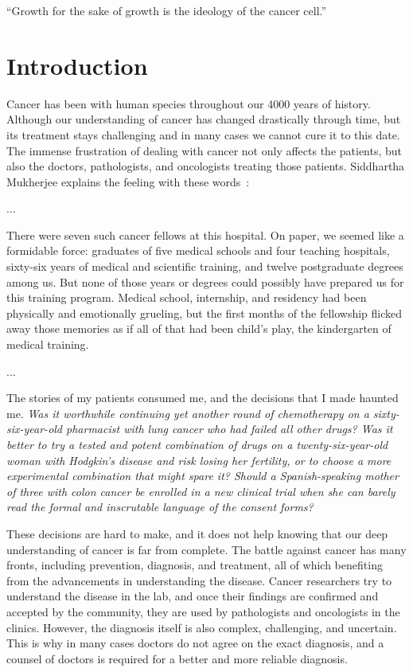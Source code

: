 
\begin{savequote}[.5\linewidth]
  ``Growth for the sake of growth is the ideology of the cancer cell.''
\end{savequote}
\chapter{Introduction}
Cancer has been with human species throughout our 4000 years of history. Although our understanding of cancer has changed drastically through time, but its treatment stays challenging and in many cases we cannot cure it to this date. The immense frustration of dealing with cancer not only affects the patients, but also the doctors, pathologists, and oncologists treating those patients. Siddhartha Mukherjee explains the feeling with these words~\cite[prologue]{the-emperor-of-all-maladies}:

\begin{displayquote}
  ...
  
  There were seven such cancer fellows at this hospital. On paper, we seemed like a formidable force: graduates of five medical schools and four teaching hospitals, sixty-six years of medical and scientific training, and twelve postgraduate degrees among us. But none of those years or degrees could possibly have prepared us for this training program. Medical school, internship, and residency had been physically and emotionally grueling, but the first months of the fellowship flicked away those memories as if all of that had been child's play, the kindergarten of medical training.

  ...

  The stories of my patients consumed me, and the decisions that I made haunted me. \emph{Was it worthwhile continuing yet another round of chemotherapy on a sixty-six-year-old pharmacist with lung cancer who had failed all other drugs? Was it better to try a tested and potent combination of drugs on a twenty-six-year-old woman with Hodgkin's disease and risk losing her fertility, or to choose a more experimental combination that might spare it? Should a Spanish-speaking mother of three with colon cancer be enrolled in a new clinical trial when she can barely read the formal and inscrutable language of the consent forms?}
\end{displayquote}

These decisions are hard to make, and it does not help knowing that our deep understanding of cancer is far from complete. The battle against cancer has many fronts, including prevention, diagnosis, and treatment, all of which benefiting from the advancements in understanding the disease. Cancer researchers try to understand the disease in the lab, and once their findings are confirmed and accepted by the community, they are used by pathologists and oncologists in the clinics. However, the diagnosis itself is also complex, challenging, and uncertain. This is why in many cases doctors do not agree on the exact diagnosis, and a counsel of doctors is required for a better and more reliable diagnosis.

